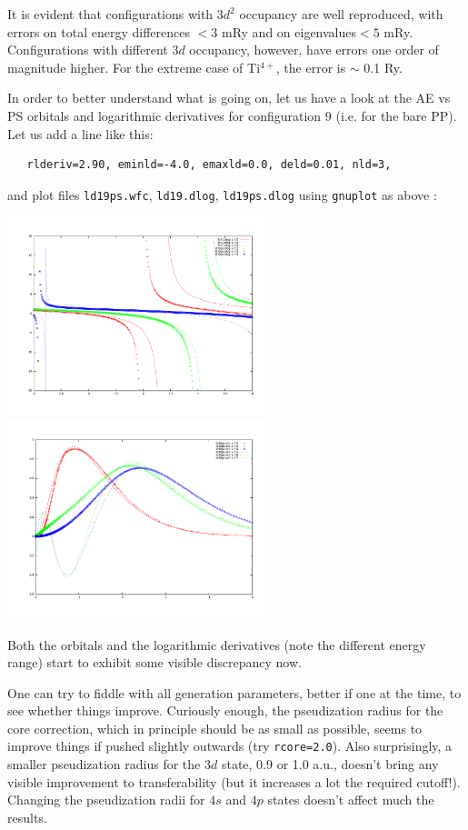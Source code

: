 \documentclass[12pt,a4paper]{article}
\begin{document}
It is evident that configurations with $3d^2$ occupancy are well 
reproduced, with errors on total energy differences $<3$ mRy and
on eigenvalues$<5$ mRy. Configurations with different $3d$ occupancy,
however, have errors one order of magnitude higher. For the extreme
case of Ti$^{4+}$, the error is $\sim$ 0.1 Ry.

In order to better understand what is going on, let us have a
look at the AE vs PS orbitals and logarithmic derivatives for
configuration 9 (i.e. for the bare PP). Let us add a line
like this:
\begin{verbatim}
   rlderiv=2.90, eminld=-4.0, emaxld=0.0, deld=0.01, nld=3,
\end{verbatim}
and plot files \texttt{ld19ps.wfc}, \texttt{ld19.dlog},
\texttt{ld19ps.dlog} using \texttt{gnuplot} as above :

\includegraphics[width=7.5cm]{pseudo-gen-fig3.pdf}
\includegraphics[width=7.5cm]{pseudo-gen-fig4.pdf}

Both the orbitals and the logarithmic derivatives (note the 
different energy range) start to exhibit some visible
discrepancy now.

One can try to fiddle with all generation parameters,
better if one at the time, to see whether things improve.
Curiously enough, the pseudization radius for the core
correction, which in principle should be as small as
possible, seems to improve things if pushed slightly 
outwards (try \texttt{rcore=2.0}). Also surprisingly,
a smaller pseudization radius for the $3d$ state, 0.9 
or 1.0 a.u., doesn't bring any visible improvement 
to transferability
(but it increases a lot the required cutoff!).
Changing the pseudization radii for $4s$ and $4p$ states
doesn't affect much the results. 
\end{document}
